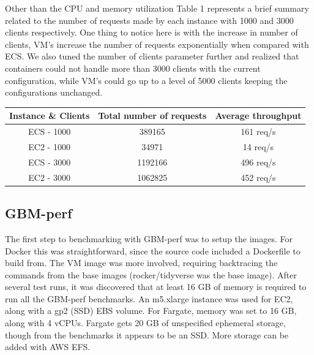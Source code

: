 \documentclass[11pt]{article}
\begin{document}
Other than the CPU and memory utilization Table 1 represents a brief summary related to the number of requests made by each instance with 1000 and 3000 clients respectively. One thing to notice here is with the increase in number of clients, VM's increase the number of requests exponentially when compared with ECS. We also tuned the number of clients parameter further and realized that containers could not handle more than 3000 clients with the current configuration, while VM's could go up to a level of 5000 clients keeping the configurations unchanged.

\begin{center}
\captionsetup[table]{position=bottom}
 \begin{tabular}{||c c c ||} 
 \hline
 Instance \& Clients & Total number of requests & Average throughput  \\ [0.5ex] 
 \hline
 ECS - 1000 & 389165 & 161 req/s  \\ 
 \hline
 EC2 - 1000 & 34971 & 14 req/s \\ 
 \hline
 ECS - 3000 & 1192166 & 496 req/s  \\ 
 \hline
 EC2 - 3000 & 1062825 & 452 req/s \\ 
  \hline

\end{tabular}

\end{center}

\subsection{GBM-perf}

The first step to benchmarking with GBM-perf was to setup the images. For Docker this was straightforward, since the source code included a Dockerfile to build from. The VM image was more involved, requiring backtracing the commands from the base images (rocker/tidyverse was the base image). After several test runs, it was discovered that at least 16 GB of memory is required to run all the GBM-perf benchmarks. An m5.xlarge instance was used for EC2, along with a gp2 (SSD) EBS volume. For Fargate, memory was set to 16 GB, along with 4 vCPUs. Fargate gets 20 GB of unspecified ephemeral storage, though from the benchmarks it appears to be an SSD. More storage can be added with AWS EFS.
\end{document}
